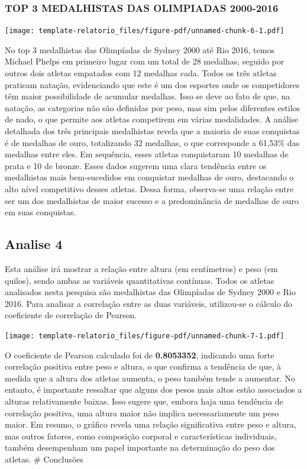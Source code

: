 \documentclass[
]{estat/estat}
\begin{document}
\subsubsection{TOP 3 MEDALHISTAS DAS OLIMPIADAS
2000-2016}\label{top-3-medalhistas-das-olimpiadas-2000-2016}

\texttt{[image: template-relatorio\_files/figure-pdf/unnamed-chunk-6-1.pdf]}

No top 3 medalhistas das Olimpíadas de Sydney 2000 até Rio 2016, temos
Michael Phelps em primeiro lugar com um total de 28 medalhas, seguido
por outros dois atletas empatados com 12 medalhas cada. Todos os três
atletas praticam natação, evidenciando que este é um dos esportes onde
os competidores têm maior possibilidade de acumular medalhas. Isso se
deve ao fato de que, na natação, as categorias não são definidas por
peso, mas sim pelos diferentes estilos de nado, o que permite aos
atletas competirem em várias modalidades. A análise detalhada dos três
principais medalhistas revela que a maioria de suas conquistas é de
medalhas de ouro, totalizando 32 medalhas, o que corresponde a 61,53\%
das medalhas entre eles. Em sequência, esses atletas conquistaram 10
medalhas de prata e 10 de bronze. Esses dados sugerem uma clara
tendência entre os medalhistas mais bem-sucedidos em conquistar medalhas
de ouro, destacando o alto nível competitivo desses atletas. Dessa
forma, observa-se uma relação entre ser um dos medalhistas de maior
sucesso e a predominância de medalhas de ouro em suas conquistas.

\subsection{Analise 4}\label{analise-4}

Esta análise irá mostrar a relação entre altura (em centímetros) e peso
(em quilos), sendo ambas as variáveis quantitativas contínuas. Todos os
atletas analisados nesta pesquisa são medalhistas das Olimpíadas de
Sydney 2000 e Rio 2016. Para analisar a correlação entre as duas
variáveis, utilizou-se o cálculo do coeficiente de correlação de
Pearson.

\texttt{[image: template-relatorio\_files/figure-pdf/unnamed-chunk-7-1.pdf]}

O coeficiente de Pearson calculado foi de \textbf{0.8053352}, indicando
uma forte correlação positiva entre peso e altura, o que confirma a
tendência de que, à medida que a altura dos atletas aumenta, o peso
também tende a aumentar. No entanto, é importante ressaltar que alguns
dos pesos mais altos estão associados a alturas relativamente baixas.
Isso sugere que, embora haja uma tendência de correlação positiva, uma
altura maior não implica necessariamente um peso maior. Em resumo, o
gráfico revela uma relação significativa entre peso e altura, mas outros
fatores, como composição corporal e características individuais, também
desempenham um papel importante na determinação do peso dos atletas. \#
Conclusões
\end{document}
